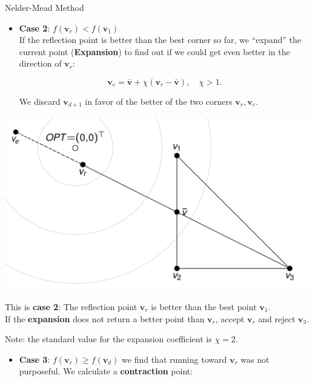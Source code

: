 \documentclass[11pt,compress,t,notes=noshow, xcolor=table]{beamer}
\begin{document}
\begin{vbframe}{Nelder-Mead Method}
\begin{enumerate}
\vspace{0.2cm}
\begin{minipage}{0.57\textwidth}
\begin{itemize}
\small
\item \textbf{Case 2}: $f(\mathbf{v}_r) < f(\mathbf{v}_1)$ \\
If the reflection point is better than the best corner so far, we \enquote{expand} the current point (\textbf{Expansion}) to find out if we could get even better in the direction of $\bm{v}_r$:

  $$
  \mathbf{v}_e = \bar{\mathbf{v}} + \chi (\mathbf{v}_{r} - \bar{\mathbf{v}}), \quad \chi > 1.
  $$

We discard $\bm{v}_{d + 1}$ in favor of the better of the two corners $\bm{v}_r, \bm{v}_e$.
\end{itemize}
\end{minipage}
\begin{minipage}{0.35\textwidth}
\begin{center}
\includegraphics[width = 1\linewidth]{figure_man/Nelder06.png}
\end{center}
\tiny
This is \textbf{case 2}: The reflection point $\bm{v}_r$ is better than the best point $\bm{v}_1$.\\
If the \textbf{expansion} does not return a better point than $\bm{v}_r$, accept $\bm{v}_r$ and reject $\bm{v}_3$.
\end{minipage}

Note: the standard value for the expansion coefficient is $\chi = 2$. 
\begin{itemize}
\small
\item \textbf{Case 3}: $f(\mathbf{v}_r) \ge f(\mathbf{v}_d)$
we find that running toward $\bm{v}_{r}$ was not purposeful.
We calculate a \textbf{contraction} point:


\end{itemize}
\end{enumerate}
\end{vbframe}
\end{document}
